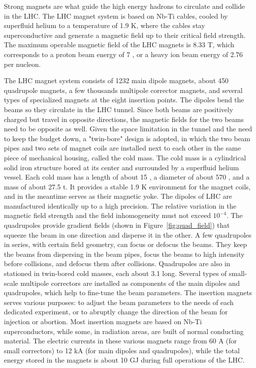 Strong magnets are what guide the high energy hadrons to circulate and collide in the LHC. 
The LHC magnet system is based on Nb-Ti cables, cooled by superfluid helium to a temperature of 1.9 K,
where the cables stay superconductive and generate a magnetic field up to their critical field strength.
The maximum operable magnetic field of the LHC magnets is 8.33 T, which corresponds to a proton beam energy of 7 \TeV,
or a heavy ion beam energy of 2.76 \TeV per nucleon.

The LHC magnet system consists of 1232 main dipole magnets, about 450 quadrupole magnets,
a few thousands multipole corrector magnets, and several types of specialized magnets at the eight insertion points.
The dipoles 
bend the beams so they circulate in the LHC tunnel.
Since both beams are positively charged but travel in opposite directions,
the magnetic fields for the two beams need to be opposite as well.
Given the space limitation in the tunnel and the need to keep the budget down, a "twin-bore" design is adopted, 
in which the two beam pipes and two sets of magnet coils are installed next to each other in the same piece of mechanical housing, called the cold mass.
The cold mass is a cylindrical solid iron structure bored at its center and surrounded by a superfluid helium vessel.
Each cold mass has a length of about 15 \meter, a diameter of about 570 \mm, and a mass of about 27.5 t.
It provides a stable 1.9 K environment for the magnet coils, and in the meantime serves as their magnetic yoke.
The dipoles of LHC are manufactured identically up to a high precision.
The relative variation in the magnetic field strength and the field inhomogeneity must not exceed $10^{-4}$.
The quadrupoles 
provide gradient fields (shown in Figure~\ref{fig:quad_field}) that squeeze the beam in one direction and disperse it in the other.
A few quadrupoles in series, with certain field geometry, can focus or defocus the beams.
They keep the beams from dispersing in the beam pipes, focus the beams to high intensity before collisions, and defocus them after collisions.
Quadrupoles are also in stationed in twin-bored cold masses, each about 3.1 \meter long.
Several types 
of small-scale multipole correctors are installed as components of the main dipoles and quadrupoles, 
which help to fine-tune the beam parameters. 
The insertion magnets 
serves various purposes: to adjust the beam parameters to the needs of each dedicated experiment, 
or to abruptly change the direction of the beam for injection or abortion.
Most insertion magnets are based on Nb-Ti superconductors, 
while some, in radiation areas, are built of normal conducting material.
The electric currents in these various magnets range from 60 A (for small correctors) to 12 kA (for main dipoles and quadrupoles),
while the total energy stored in the magnets is about 10 GJ during full operations of the LHC.


